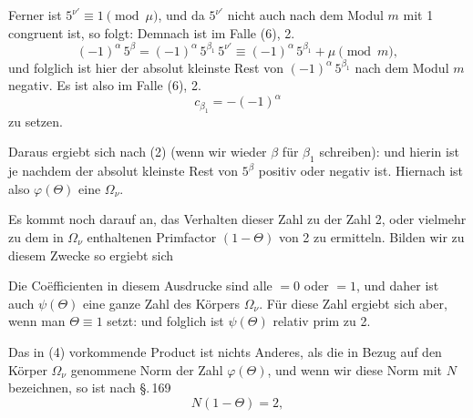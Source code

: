 
Ferner ist $5^{\nu'} \equiv 1 \pmod{\mu}$, und da $5^{\nu'}$ nicht auch nach dem
Modul $m$ mit 1 congruent ist, so folgt:
Demnach ist im Falle (6), 2.
\[
(-1)^\alpha\,5^\beta = (-1)^\alpha\,5^{\beta_1}\,5^{\nu'} \equiv (-1)^\alpha\,5^{\beta_1} + \mu \pmod{m},
\]
und folglich ist hier der absolut kleinste Rest von $(-1)^\alpha\,5^{\beta_1}$
nach dem Modul $m$ negativ. Es ist also im Falle (6), 2.
\[
c_{\beta_1} = -(-1)^\alpha
\]
zu setzen.

Daraus ergiebt sich nach (2) (wenn wir wieder $\beta$ für $\beta_1$
schreiben):
und hierin ist
je nachdem der absolut kleinste Rest von $5^\beta$ positiv oder
negativ ist. Hiernach ist also $\varphi(\Theta)$ eine  $\Omega_\nu$.

Es kommt noch darauf an, das Verhalten dieser Zahl zu
der Zahl 2, oder vielmehr zu dem in $\Omega_\nu$ enthaltenen Primfactor
$(1 - \Theta)$ von 2 zu ermitteln. Bilden wir zu diesem Zwecke
so ergiebt sich

Die Co\"efficienten in diesem Ausdrucke sind alle $= 0$ oder
$= 1$, und daher ist auch $\psi(\Theta)$ eine ganze Zahl des Körpers $\Omega_\nu$.
Für diese Zahl ergiebt sich aber, wenn man $\Theta \equiv 1$ setzt:
und folglich ist $\psi(\Theta)$ relativ prim zu 2.

Das in (4) vorkommende Product ist nichts Anderes, als die
in Bezug auf den Körper $\Omega_\nu$ genommene Norm der Zahl $\varphi(\Theta)$,
und wenn wir diese Norm mit $N$ bezeichnen, so ist nach \S.\,169
\[
N(1-\Theta) = 2,
\]
